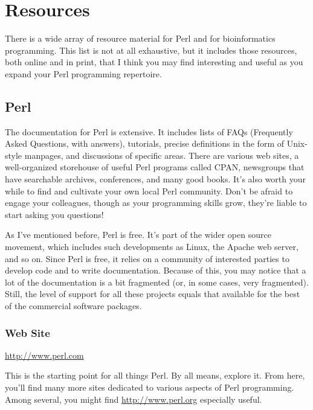 \chapter{Resources}
\label{chap:chapteraa}
\minitoc

There is a wide array of resource material for Perl and for bioinformatics programming. This list is not at all exhaustive, but it includes those resources, both online and in print, that I think you may find interesting and useful as you expand your Perl programming repertoire.

\section{Perl}
The documentation for Perl is extensive. It includes lists of FAQs (Frequently Asked Questions, with answers), tutorials, precise definitions in the form of Unix-style manpages, and discussions of specific areas. There are various web sites, a well-organized storehouse of useful Perl programs called CPAN, newsgroups that have searchable archives, conferences, and many good books. It's also worth your while to find and cultivate your own local Perl community. Don't be afraid to engage your colleagues, though as your programming skills grow, they're liable to start asking you questions!

As I've mentioned before, Perl is free. It's part of the wider open source movement, which includes such developments as Linux, the Apache web server, and so on. Since Perl is free, it relies on a community of interested parties to develop code and to write documentation. Because of this, you may notice that a lot of the documentation is a bit fragmented (or, in some cases, very fragmented). Still, the level of support for all these projects equals that available for the best of the commercial software packages.

\subsection{Web Site}
\href{http://www.perl.com}{http://www.perl.com}

\begin{adjustwidth}{2em}{}
This is the starting point for all things Perl. By all means, explore it. From here, you'll find many more sites dedicated to various aspects of Perl programming. Among several, you might find \href{http://www.perl.org}{http://www.perl.org} especially useful.
\end{adjustwidth}


